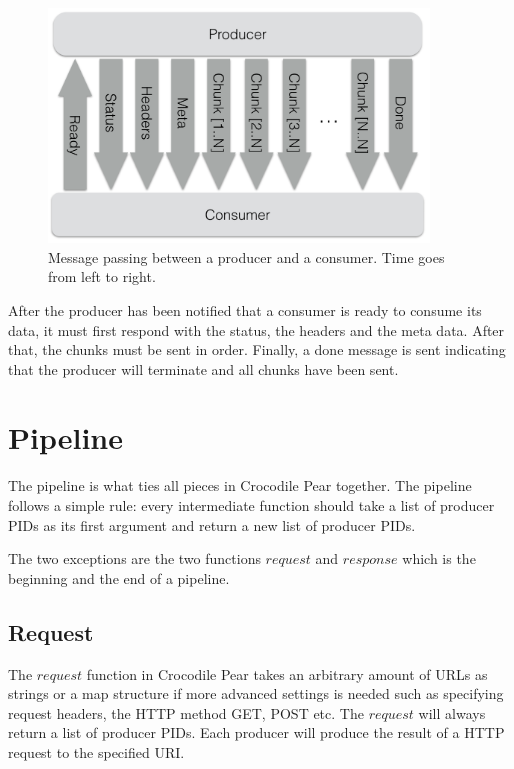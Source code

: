 \documentclass{cslthse-msc}
\begin{document}
\begin{figure}[H]
  \centering
    \begin{center}
      \includegraphics[width=0.9\textwidth]{images/crocpear_producer_consumer.png}
    \end{center}
  \caption{Message passing between a producer and a consumer. Time goes from left to right.}
\end{figure}

After the producer has been notified that a consumer is ready to consume its data, it must first respond with the status, the headers and the meta data. After that, the chunks must be sent in order. Finally, a done message is sent indicating that the producer will terminate and all chunks have been sent.

\section{Pipeline}
The pipeline is what ties all pieces in Crocodile Pear together. The pipeline follows a simple rule: every intermediate function should take a list of producer PIDs as its first argument and return a new list of producer PIDs.

The two exceptions are the two functions $request$ and $response$ which is the beginning and the end of a pipeline.

\subsection{Request}
The $request$ function in Crocodile Pear takes an arbitrary amount of URLs as strings or a map structure if more advanced settings is needed such as specifying request headers, the HTTP method GET, POST etc. The $request$ will always return a list of producer PIDs. Each producer will produce the result of a HTTP request to the specified URI.
\end{document}
